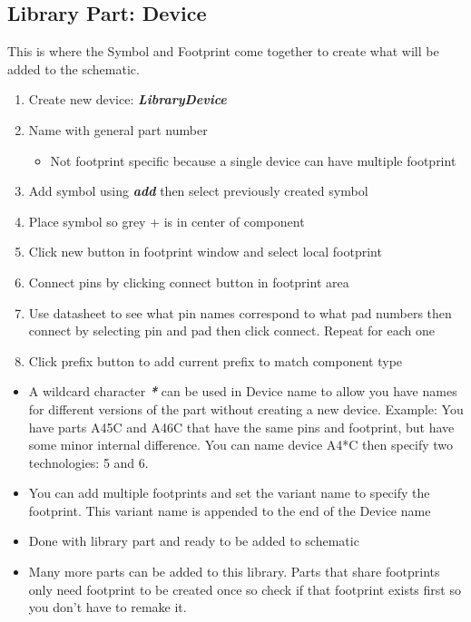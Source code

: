 \documentclass{article}
\begin{document}
\subsection{Library Part: Device}
This is where the Symbol and Footprint come together to create what will be added to the schematic.
\begin{enumerate}
    \item Create new device: \textit{\textbf{Library\textrightarrow Device}}
    \item Name with general part number
    \begin{itemize}
        \item Not footprint specific because a single device can have multiple footprint
    \end{itemize}
    \item Add symbol using \textit{\textbf{add}} then select previously created symbol
    \item Place symbol so grey + is in center of component
    \item Click new button in footprint window and select local footprint
    \item Connect pins by clicking connect button in footprint area
    \item Use datasheet to see what pin names correspond to what pad numbers then connect by selecting pin and pad then click connect. Repeat for each one
    \item Click prefix button to add current prefix to match component type
\end{enumerate}
\begin{tcolorbox} [title=Tips \& Tricks]
    \begin{itemize}
        \item A wildcard character \textit{\textbf{*}} can be used in Device name to allow you have names for different versions of the part without creating a new device. Example: You have parts A45C and A46C that have the same pins and footprint, but have some minor internal difference. You can name device A4*C then specify two technologies: 5 and 6.
        \item You can add multiple footprints and set the variant name to specify the footprint. This variant name is appended to the end of the Device name
    \end{itemize}
\end{tcolorbox}

\begin{itemize}
    \item Done with library part and ready to be added to schematic
    \item Many more parts can be added to this library. Parts that share footprints only need footprint to be created once so check if that footprint exists first so you don't have to remake it.
\end{itemize}
\end{document}
